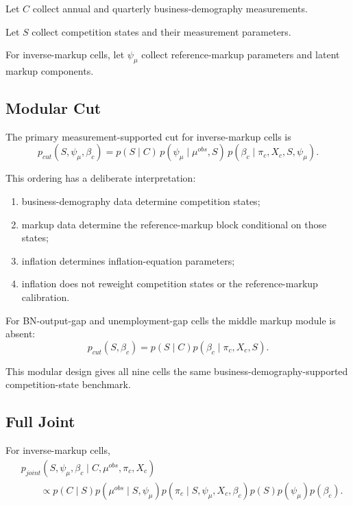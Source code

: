 \documentclass[11pt]{article}
\begin{document}
Let \(C\) collect annual and quarterly business-demography measurements.

Let \(S\) collect competition states and their measurement parameters.

For inverse-markup cells, let \(\psi_\mu\) collect reference-markup parameters and latent markup components.

\subsection{Modular Cut}

The primary measurement-supported cut for inverse-markup cells is
\begin{equation}
p_{cut}(S,\psi_\mu,\beta_c)
=
p(S\mid C)
\,p(\psi_\mu\mid \mu^{obs},S)
\,p(\beta_c\mid\pi_c,X_c,S,\psi_\mu).
\label{eq:cut_inverse_markup}
\end{equation}

This ordering has a deliberate interpretation:
\begin{enumerate}
\item business-demography data determine competition states;
\item markup data determine the reference-markup block conditional on those states;
\item inflation determines inflation-equation parameters;
\item inflation does not reweight competition states or the reference-markup calibration.
\end{enumerate}

For BN-output-gap and unemployment-gap cells the middle markup module is absent:
\begin{equation}
p_{cut}(S,\beta_c)
=
p(S\mid C)
p(\beta_c\mid\pi_c,X_c,S).
\label{eq:cut_gap}
\end{equation}

This modular design gives all nine cells the same business-demography-supported competition-state benchmark.

\subsection{Full Joint}

For inverse-markup cells,
\begin{align}
&p_{joint}
(S,\psi_\mu,\beta_c
\mid
C,\mu^{obs},\pi_c,X_c)
\nonumber\\
&\qquad\propto
p(C\mid S)
p(\mu^{obs}\mid S,\psi_\mu)
p(\pi_c\mid S,\psi_\mu,X_c,\beta_c)
p(S)p(\psi_\mu)p(\beta_c).
\label{eq:full_joint_inverse_markup}
\end{align}
\end{document}

